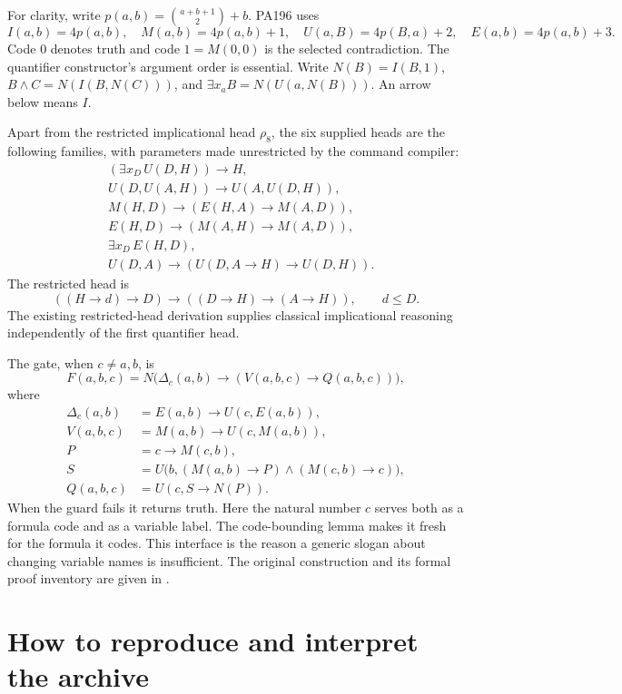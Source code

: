 \documentclass[11pt,letterpaper]{article}
\begin{document}
For clarity, write $p(a,b)=\binom{a+b+1}{2}+b$. PA196 uses
\[
 I(a,b)=4p(a,b),\quad M(a,b)=4p(a,b)+1,\quad
 U(a,B)=4p(B,a)+2,\quad E(a,b)=4p(a,b)+3.
\]
Code $0$ denotes truth and code $1=M(0,0)$ is the selected contradiction.
The quantifier constructor's argument order is essential. Write
$N(B)=I(B,1)$, $B\wedge C=N(I(B,N(C)))$, and
$\exists x_a B=N(U(a,N(B)))$. An arrow below means $I$.

Apart from the restricted implicational head $\rho_8$, the six supplied
heads are the following families, with parameters made unrestricted by
the command compiler:
\begin{align*}
 & (\exists x_D\,U(D,H))\to H,\\
 & U(D,U(A,H))\to U(A,U(D,H)),\\
 & M(H,D)\to(E(H,A)\to M(A,D)),\\
 & E(H,D)\to(M(A,H)\to M(A,D)),\\
 & \exists x_D\,E(H,D),\\
 & U(D,A)\to(U(D,A\to H)\to U(D,H)).
\end{align*}
The restricted head is
\[
 ((H\to d)\to D)\to((D\to H)\to(A\to H)),\qquad d\le D.
\]
The existing restricted-head derivation supplies classical implicational
reasoning independently of the first quantifier head.

The gate, when $c\ne a,b$, is
\[
 F(a,b,c)=N\bigl(\Delta_c(a,b)\to(V(a,b,c)\to Q(a,b,c))\bigr),
\]
where
\begin{align*}
 \Delta_c(a,b)&=E(a,b)\to U(c,E(a,b)),\\
 V(a,b,c)&=M(a,b)\to U(c,M(a,b)),\\
 P&=c\to M(c,b),\\
 S&=U\bigl(b,(M(a,b)\to P)\wedge(M(c,b)\to c)\bigr),\\
 Q(a,b,c)&=U(c,S\to N(P)).
\end{align*}
When the guard fails it returns truth. Here the natural number $c$
serves both as a formula code and as a variable label. The code-bounding
lemma makes it fresh for the formula it codes. This interface is the
reason a generic slogan about changing variable names is insufficient.
The original construction and its formal proof inventory are given in
\cite{pa196,result,pa209}.




\section{How to reproduce and interpret the archive}
\end{document}
